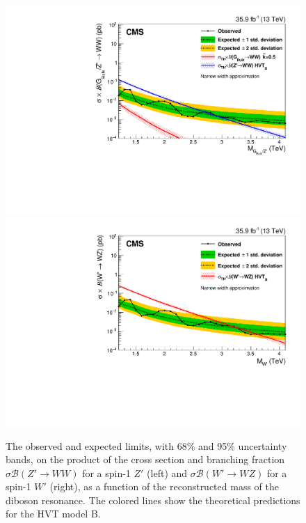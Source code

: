 \begin{figure}[!htb]
  \centering
    \includegraphics[width=.495\textwidth]{figures/B2G-17-001/CMS-B2G-17-001_Figure_006-a.pdf}%
    \includegraphics[width=.495\textwidth]{figures/B2G-17-001/CMS-B2G-17-001_Figure_006-b.pdf}
  \caption{The observed and expected limits, with 68\% and 95\% uncertainty bands, on the product of the cross section and branching fraction $\sigma \mathcal{B} (Z' \rightarrow WW)$ for a spin-1 $Z'$ (left) and $\sigma \mathcal{B} (W' \rightarrow WZ)$ for a spin-1 $W'$ (right), as a function of the reconstructed mass of the diboson resonance. The colored lines show the theoretical predictions for the HVT model B.}
  \label{fig:theory_B2G-17-001}
\end{figure}


